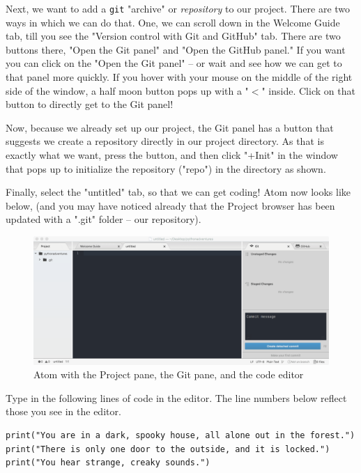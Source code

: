 Next, we want to add a \texttt{git} "archive" or \emph{repository} to our project. There are two ways in which we can do that. One, we can scroll down in the Welcome Guide tab, till you see the "Version control with Git and GitHub" tab. There are two buttons there, "Open the Git panel" and "Open the GitHub panel." If you want you can click on the "Open the Git panel" -- or wait and see how we can get to that panel more quickly. If you hover with your mouse on the middle of the right side of the window, a half moon button pops up with a "$<$" inside. Click on that button to directly get to the Git panel! 

Now, because we already set up our project, the Git panel has a button that suggests we create a repository directly in our project directory. As that is exactly what we want, press the button, and then click "+Init" in the window that pops up to initialize the repository ("repo") in the directory as shown.  

Finally, select the "untitled" tab, so that we can get coding! Atom now looks like below, (and you may have noticed already that the Project browser has been updated with a ".git" folder -- our repository). 

\begin{figure}[h]
\centerline{\includegraphics[scale=.20]{images/p1ch1-gituntitledprojectbrowser.png}}
\caption{Atom with the Project pane, the Git pane, and the code editor}
\end{figure} 

Type in the following lines of code in the editor. The line numbers below reflect those you see in the editor. 

\pagebreak

\begin{lstlisting}
print("You are in a dark, spooky house, all alone out in the forest.")
print("There is only one door to the outside, and it is locked.")
print("You hear strange, creaky sounds.")
\end{lstlisting}

